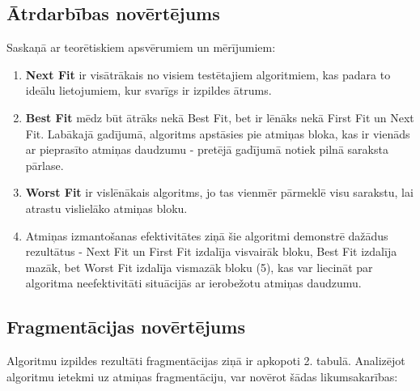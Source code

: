 \documentclass{report}
\begin{document}
	\subsection{Ātrdarbības novērtējums}
	
	Saskaņā ar teorētiskiem apsvērumiem un mērījumiem:
	
	\begin{enumerate}
		\item \textbf{Next Fit} ir visātrākais no visiem testētajiem algoritmiem, kas padara to ideālu lietojumiem, kur svarīgs ir izpildes ātrums.

		\item \textbf{Best Fit} mēdz būt ātrāks nekā Best Fit, bet ir lēnāks nekā First Fit un Next Fit. Labākajā gadījumā, algoritms apstāsies pie atmiņas bloka, kas ir vienāds ar pieprasīto atmiņas daudzumu - pretējā gadījumā notiek pilnā saraksta pārlase.

		\item \textbf{Worst Fit} ir vislēnākais algoritms, jo tas vienmēr pārmeklē visu sarakstu, lai atrastu vislielāko atmiņas bloku. 
		
		\item Atmiņas izmantošanas efektivitātes ziņā šie algoritmi demonstrē dažādus rezultātus - Next Fit un First Fit izdalīja visvairāk bloku, Best Fit izdalīja mazāk, bet Worst Fit izdalīja vismazāk bloku (5), kas var liecināt par algoritma neefektivitāti situācijās ar ierobežotu atmiņas daudzumu.
	\end{enumerate}
	
	\subsection{Fragmentācijas novērtējums}
	
	Algoritmu izpildes rezultāti fragmentācijas ziņā ir apkopoti 2. tabulā. Analizējot algoritmu ietekmi uz atmiņas fragmentāciju, var novērot šādas likumsakarības:
	
\end{document}
